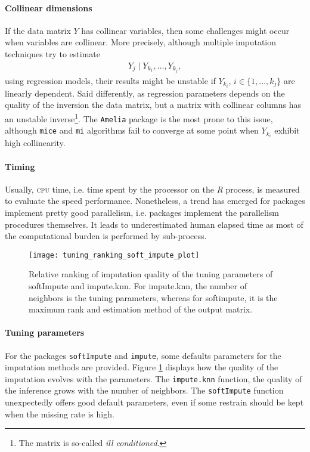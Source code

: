 \paragraph{Collinear dimensions}

If the data matrix $Y$ has collinear variables, then some challenges might occur
when variables are collinear. More precisely, although multiple imputation
techniques try to estimate
\begin{align*}
  Y_j \; |\; Y_{k_1}, \dots, Y_{k_j},
\end{align*}
using regression models, their results might be unstable if
$Y_{k_i},\, i \in \{1, \dots, k_j\}$ are linearly dependent. Said differently, as
regression parameters depends on the quality of the inversion the data matrix,
but a matrix with collinear columns has an unstable inverse\footnote{The matrix
  is so-called \emph{ill conditioned}.}. The \texttt{Amelia}
package is the most prone to this issue, although \texttt{mice} and \texttt{mi}
algorithms fail to converge at some point when $Y_{k_i}$ exhibit high
collinearity.

\paragraph{Timing}
Usually, \textsc{cpu} time, i.e. time spent by the processor on the \emph{R}
process, is measured to evaluate the speed performance. Nonetheless, a trend
has emerged for packages implement pretty good parallelism, i.e. packages
implement the parallelism procedures themselves. It leads to underestimated
human elapsed time as most of the computational burden is performed by
sub-process.

\begin{figure}
  \centering
  \texttt{[image: tuning\_ranking\_soft\_impute\_plot]}
  \caption{Relative ranking of imputation quality of the tuning parameters of
    softImpute and impute.knn. For impute.knn, the number of neighbors is the
    tuning parameters, whereas for softimpute, it is the maximum rank and estimation
    method of the output matrix.}
  \label{fig:tuning:param:softimpute:imputeknn}
\end{figure}

\paragraph{Tuning parameters}
For the packages \texttt{softImpute} and \texttt{impute}, some defaults
parameters for the imputation methods are provided. Figure
\ref{fig:tuning:param:softimpute:imputeknn} displays how the quality of the
imputation evolves with the parameters. The \texttt{impute.knn} function, the
quality of the inference grows with the number of neighbors. The
\texttt{softImpute} function unexpectedly offers good default parameters, even
if some restrain should be kept when the missing rate is high.

